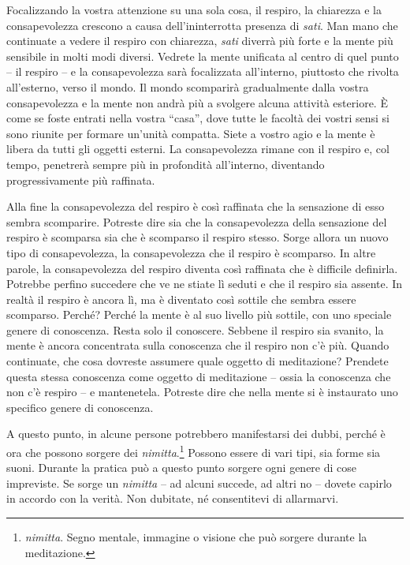 Focalizzando la vostra attenzione su una sola cosa, il respiro, la
chiarezza e la consapevolezza crescono a causa dell'ininterrotta
presenza di \emph{sati}. Man mano che continuate a vedere il respiro con
chiarezza, \emph{sati} diverrà più forte e la mente più sensibile in
molti modi diversi. Vedrete la mente unificata al centro di quel punto
-- il respiro -- e la consapevolezza sarà focalizzata all'interno,
piuttosto che rivolta all'esterno, verso il mondo. Il mondo scomparirà
gradualmente dalla vostra consapevolezza e la mente non andrà più a
svolgere alcuna attività esteriore. È come se foste entrati nella vostra
``casa'', dove tutte le facoltà dei vostri sensi si sono riunite per
formare un'unità compatta. Siete a vostro agio e la mente è libera da
tutti gli oggetti esterni. La consapevolezza rimane con il respiro e,
col tempo, penetrerà sempre più in profondità all'interno, diventando
progressivamente più raffinata.

Alla fine la consapevolezza del respiro è così raffinata che la
sensazione di esso sembra scomparire. Potreste dire sia che la
consapevolezza della sensazione del respiro è scomparsa sia che è
scomparso il respiro stesso. Sorge allora un nuovo tipo di
consapevolezza, la consapevolezza che il respiro è scomparso. In altre
parole, la consapevolezza del respiro diventa così raffinata che è
difficile definirla. Potrebbe perfino succedere che ve ne stiate lì
seduti e che il respiro sia assente. In realtà il respiro è ancora lì,
ma è diventato così sottile che sembra essere scomparso. Perché? Perché
la mente è al suo livello più sottile, con uno speciale genere di
conoscenza. Resta solo il conoscere. Sebbene il respiro sia svanito, la
mente è ancora concentrata sulla conoscenza che il respiro non c'è più.
Quando continuate, che cosa dovreste assumere quale oggetto di
meditazione? Prendete questa stessa conoscenza come oggetto di
meditazione -- ossia la conoscenza che non c'è respiro -- e mantenetela.
Potreste dire che nella mente si è instaurato uno specifico genere di
conoscenza.

A questo punto, in alcune persone potrebbero manifestarsi dei dubbi,
perché è ora che possono sorgere dei \emph{nimitta}.\footnote{\emph{nimitta}.
  Segno mentale, immagine o visione che può sorgere durante la
  meditazione.} Possono essere di vari tipi, sia forme sia suoni.
Durante la pratica può a questo punto sorgere ogni genere di cose
impreviste. Se sorge un \emph{nimitta} -- ad alcuni succede, ad altri no
-- dovete capirlo in accordo con la verità. Non dubitate, né
consentitevi di allarmarvi.

